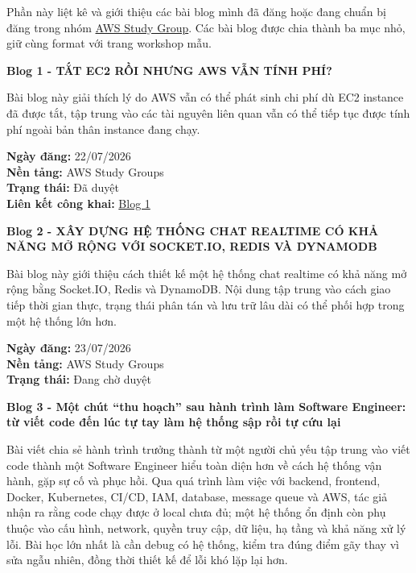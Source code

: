 Phần này liệt kê và giới thiệu các bài blog mình đã đăng hoặc đang chuẩn
bị đăng trong nhóm
\href{https://www.facebook.com/groups/awsstudygroupfcj}{AWS Study
Group}. Các bài blog được chia thành ba mục nhỏ, giữ cùng format với
trang workshop mẫu.

\vspace{0.5em}\noindent\textbf{Blog 1 - TẮT EC2 RỒI NHƯNG AWS VẪN TÍNH
PHÍ?}\par

Bài blog này giải thích lý do AWS vẫn có thể phát sinh chi phí dù EC2
instance đã được tắt, tập trung vào các tài nguyên liên quan vẫn có thể
tiếp tục được tính phí ngoài bản thân instance đang chạy.

\textbf{Ngày đăng:} 22/07/2026\\
\textbf{Nền tảng:} AWS Study Groups\\
\textbf{Trạng thái:} Đã duyệt\\
\textbf{Liên kết công khai:}
\href{https://www.facebook.com/groups/awsstudygroupfcj/permalink/2219932025438424/?rdid=SGRgenG5JS3UR6Y0\#}{Blog
1}

\vspace{0.5em}\noindent\textbf{Blog 2 - XÂY DỰNG HỆ THỐNG CHAT REALTIME CÓ KHẢ NĂNG MỞ
RỘNG VỚI SOCKET.IO, REDIS VÀ
DYNAMODB}\par

Bài blog này giới thiệu cách thiết kế một hệ thống chat realtime có khả
năng mở rộng bằng Socket.IO, Redis và DynamoDB. Nội dung tập trung vào
cách giao tiếp thời gian thực, trạng thái phân tán và lưu trữ lâu dài có
thể phối hợp trong một hệ thống lớn hơn.

\textbf{Ngày đăng:} 23/07/2026\\
\textbf{Nền tảng:} AWS Study Groups\\
\textbf{Trạng thái:} Đang chờ duyệt

\vspace{0.5em}\noindent\textbf{Blog 3 - Một chút ``thu hoạch'' sau hành trình làm
Software Engineer: từ viết code đến lúc tự tay làm hệ thống sập rồi tự
cứu
lại}\par

Bài viết chia sẻ hành trình trưởng thành từ một người chủ yếu tập trung
vào viết code thành một Software Engineer hiểu toàn diện hơn về cách hệ
thống vận hành, gặp sự cố và phục hồi. Qua quá trình làm việc với
backend, frontend, Docker, Kubernetes, CI/CD, IAM, database, message
queue và AWS, tác giả nhận ra rằng code chạy được ở local chưa đủ; một
hệ thống ổn định còn phụ thuộc vào cấu hình, network, quyền truy cập, dữ
liệu, hạ tầng và khả năng xử lý lỗi. Bài học lớn nhất là cần debug có hệ
thống, kiểm tra đúng điểm gãy thay vì sửa ngẫu nhiên, đồng thời thiết kế
để lỗi khó lặp lại hơn.

